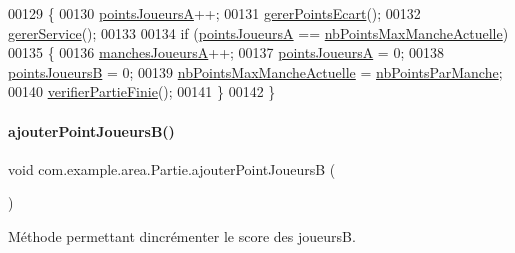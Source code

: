 \begin{DoxyCode}
00129     \{
00130         \hyperlink{classcom_1_1example_1_1area_1_1_partie_ad1075e561acb71ac3307570f79795b1c}{pointsJoueursA}++;
00131         \hyperlink{classcom_1_1example_1_1area_1_1_partie_a2838da99f206d736a22f8a3f271365b2}{gererPointsEcart}();
00132         \hyperlink{classcom_1_1example_1_1area_1_1_partie_a52c8e133b23468d4b2c4338a80c3763c}{gererService}();
00133 
00134         \textcolor{keywordflow}{if} (\hyperlink{classcom_1_1example_1_1area_1_1_partie_ad1075e561acb71ac3307570f79795b1c}{pointsJoueursA} == \hyperlink{classcom_1_1example_1_1area_1_1_partie_a4b5e5464eb3b37f7c78d4134bf29a7f8}{nbPointsMaxMancheActuelle})
00135         \{
00136             \hyperlink{classcom_1_1example_1_1area_1_1_partie_a4563ef3464c670e68405bb7256abb770}{manchesJoueursA}++;
00137             \hyperlink{classcom_1_1example_1_1area_1_1_partie_ad1075e561acb71ac3307570f79795b1c}{pointsJoueursA} = 0;
00138             \hyperlink{classcom_1_1example_1_1area_1_1_partie_ae1ceb321b45437487124b1d886c7297c}{pointsJoueursB} = 0;
00139             \hyperlink{classcom_1_1example_1_1area_1_1_partie_a4b5e5464eb3b37f7c78d4134bf29a7f8}{nbPointsMaxMancheActuelle} = 
      \hyperlink{classcom_1_1example_1_1area_1_1_partie_a23cd7e19042eece7057f810bba2f4f2c}{nbPointsParManche};
00140             \hyperlink{classcom_1_1example_1_1area_1_1_partie_ad07c65c2ba36cd08798cee1ba6b99c81}{verifierPartieFinie}();
00141         \}
00142     \}
\end{DoxyCode}
\mbox{\label{classcom_1_1example_1_1area_1_1_partie_aadc82cc11b982008b81f886adbc4e63a}} 
\paragraph{\texorpdfstring{ajouter\+Point\+Joueurs\+B()}{ajouterPointJoueursB()}}
{\footnotesize\ttfamily void com.\+example.\+area.\+Partie.\+ajouter\+Point\+JoueursB (\begin{DoxyParamCaption}{ }\end{DoxyParamCaption})}



Méthode permettant d\textquotesingle{}incrémenter le score des joueursB. 




